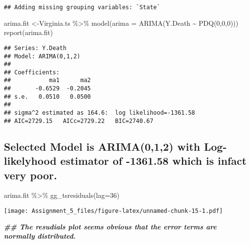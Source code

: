 \documentclass[
]{article}
\newenvironment{Shaded}{\begin{snugshade}}{\end{snugshade}}
\newcommand{\AttributeTok}[1]{\textcolor[rgb]{0.77,0.63,0.00}{#1}}
\newcommand{\DecValTok}[1]{\textcolor[rgb]{0.00,0.00,0.81}{#1}}
\newcommand{\DocumentationTok}[1]{\textcolor[rgb]{0.56,0.35,0.01}{\textbf{\textit{#1}}}}
\newcommand{\FunctionTok}[1]{\textcolor[rgb]{0.00,0.00,0.00}{#1}}
\newcommand{\NormalTok}[1]{#1}
\newcommand{\OtherTok}[1]{\textcolor[rgb]{0.56,0.35,0.01}{#1}}
\newcommand{\SpecialCharTok}[1]{\textcolor[rgb]{0.00,0.00,0.00}{#1}}
\begin{document}
\begin{verbatim}
## Adding missing grouping variables: `State`
\end{verbatim}

\begin{Shaded}
\begin{Highlighting}[]
\NormalTok{arima.fit }\OtherTok{\textless{}{-}}\NormalTok{Virginia.ts }\SpecialCharTok{\%\textgreater{}\%}
  \FunctionTok{model}\NormalTok{(}\AttributeTok{arima =} \FunctionTok{ARIMA}\NormalTok{(Y.Death }\SpecialCharTok{\textasciitilde{}} \FunctionTok{PDQ}\NormalTok{(}\DecValTok{0}\NormalTok{,}\DecValTok{0}\NormalTok{,}\DecValTok{0}\NormalTok{)))}
\FunctionTok{report}\NormalTok{(arima.fit)}
\end{Highlighting}
\end{Shaded}

\begin{verbatim}
## Series: Y.Death 
## Model: ARIMA(0,1,2) 
## 
## Coefficients:
##           ma1      ma2
##       -0.6529  -0.2045
## s.e.   0.0510   0.0500
## 
## sigma^2 estimated as 164.6:  log likelihood=-1361.58
## AIC=2729.15   AICc=2729.22   BIC=2740.67
\end{verbatim}

\hypertarget{selected-model-is-arima012-with-log-likelyhood-estimator-of--1361.58-which-is-infact-very-poor.}{%
\subsection{Selected Model is ARIMA(0,1,2) with Log-likelyhood estimator
of -1361.58 which is infact very
poor.}\label{selected-model-is-arima012-with-log-likelyhood-estimator-of--1361.58-which-is-infact-very-poor.}}

\begin{Shaded}
\begin{Highlighting}[]
\NormalTok{arima.fit }\SpecialCharTok{\%\textgreater{}\%} \FunctionTok{gg\_tsresiduals}\NormalTok{(}\AttributeTok{lag=}\DecValTok{36}\NormalTok{)}
\end{Highlighting}
\end{Shaded}

\texttt{[image: Assignment\_5\_files/figure-latex/unnamed-chunk-15-1.pdf]}

\begin{Shaded}
\begin{Highlighting}[]
\DocumentationTok{\#\# The resudials plot seems obvious that the error terms are normally distributed.}
\end{Highlighting}
\end{Shaded}
\end{document}
